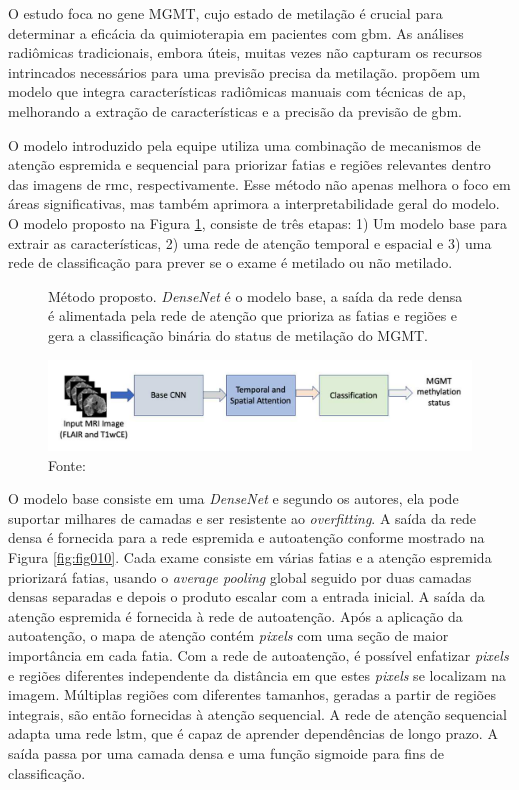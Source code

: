 O estudo foca no gene MGMT, cujo estado de metilação é crucial para determinar a eficácia da quimioterapia em pacientes com \gls{gbm}. As análises radiômicas tradicionais, embora úteis, muitas vezes não capturam os recursos intrincados necessários para uma previsão precisa da metilação.  propõem um modelo que integra características radiômicas manuais com técnicas de \gls{ap}, melhorando a extração de características e a precisão da previsão de \gls{gbm}.

O modelo introduzido pela equipe utiliza uma combinação de mecanismos de atenção espremida e sequencial para priorizar fatias e regiões relevantes dentro das imagens de \gls{rmc}, respectivamente. Esse método não apenas melhora o foco em áreas significativas, mas também aprimora a interpretabilidade geral do modelo. O modelo proposto na Figura \ref{fig:fig009}, consiste de três etapas: 1) Um modelo base para extrair as características, 2) uma rede de atenção temporal e espacial e 3) uma rede de classificação para prever se o exame é metilado ou não metilado.
\newline

\begin{figure}[htbp]
    \centering
    \captionsetup{width=0.98\textwidth, justification=justified}
    \caption{Método proposto. \textit{DenseNet} é o modelo base, a saída da rede densa é alimentada pela rede de atenção que prioriza as fatias e regiões e gera a classificação binária do status de metilação do MGMT.
    }
    \includegraphics[width=1\textwidth]{figures/fig009.png}
    \caption*{Fonte: \cite{iranmehrImprovedPredictionMGMT2022}}
    \label{fig:fig009}
\end{figure}

O modelo base consiste em uma \textit{DenseNet} e segundo os autores, ela pode suportar milhares de camadas e ser resistente ao \textit{overfitting}. A saída da rede densa é fornecida para a rede espremida e autoatenção conforme mostrado na Figura \ref{fig:fig010}. Cada exame consiste em várias fatias e a atenção espremida priorizará fatias, usando o \textit{average pooling} global seguido por duas camadas densas separadas e depois o produto escalar com a entrada inicial. A saída da atenção espremida é fornecida à rede de autoatenção. Após a aplicação da autoatenção, o mapa de atenção contém \textit{pixels} com uma seção de maior importância em cada fatia. Com a rede de autoatenção, é possível enfatizar \textit{pixels} e regiões diferentes independente da distância em que estes \textit{pixels} se localizam na imagem. Múltiplas regiões com diferentes tamanhos, geradas a partir de regiões integrais, são então fornecidas à atenção sequencial. A rede de atenção sequencial adapta uma rede \gls{lstm}, que é capaz de aprender dependências de longo prazo. A saída passa por uma camada densa e uma função sigmoide para fins de classificação.

